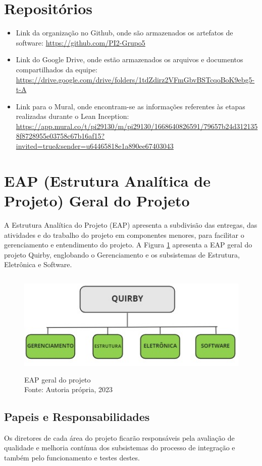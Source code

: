 \section{Repositórios}
\begin{itemize}
\item Link da organização no Github, onde são armazenados os artefatos de software: \url{https://github.com/PI2-Grupo5}
\item Link do Google Drive, onde estão armazenados os arquivos e documentos compartilhados da equipe: \url{https://drive.google.com/drive/folders/1tdZdirz2VFmGbvBSTcqoBoK9ebg5-t-A}
\item Link para o Mural, onde encontram-se as informações referentes às etapas realizadas durante o Lean Inception: \url{https://app.mural.co/t/pi29130/m/pi29130/1668640826591/79657b24d3121358f8728955e03758c67b16af15?invited=true&sender=u64465818e1a890ee67403043} 
\end{itemize}
\section{EAP (Estrutura Analítica de Projeto) Geral do Projeto}
\label{EAP}
A Estrutura Analítica do Projeto (EAP) apresenta a subdivisão das entregas, das atividades e do trabalho do projeto em componentes menores, para facilitar o gerenciamento e entendimento do projeto. A Figura \ref{Fig10-Eap} apresenta a EAP geral do projeto Quirby, englobando o Gerenciamento e os subsistemas de Estrutura, Eletrônica e Software.

\begin{figure}[H]
\begin{center}
\includegraphics[width= 11.5 cm, height = 5cm]{figuras/Fig10.jpg}
\caption{EAP geral do projeto \\ Fonte: Autoria própria, 2023}
\label{Fig10-Eap}
\end{center}
\end{figure}

\subsection{Papeis e Responsabilidades}
Os diretores de cada área do projeto ficarão responsáveis pela avaliação de qualidade e melhoria contínua dos subsistemas do processo de integração e também pelo funcionamento e testes destes.

